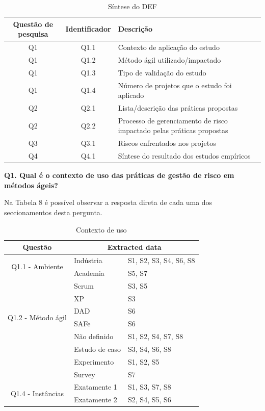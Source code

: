 \documentclass[
	12pt,
	openright,
	twoside,
	a4paper,
	english,
	brazil
	]{abntex2}
\begin{document}
\begin{table}[h!]
  \centering
  \caption{Síntese do DEF}
  \begin{tabular}{|c|c|l|}
  \hline
  \textbf{Questão de pesquisa} & \textbf{Identificador} & \textbf{Descrição} \\ \hline
  Q1 & Q1.1 & Contexto de aplicação do estudo \\ \hline
  Q1 & Q1.2 & Método ágil utilizado/impactado \\ \hline
  Q1 & Q1.3 & Tipo de validação do estudo \\ \hline
  Q1 & Q1.4 & Número de projetos que o estudo foi aplicado \\ \hline
  Q2 & Q2.1 & Lista/descrição das práticas propostas \\ \hline
  Q2 & Q2.2 & Processo de gerenciamento de risco impactado pelas práticas propostas \\ \hline
  Q3 & Q3.1 & Riscos enfrentados nos projetos \\ \hline
  Q4 & Q4.1 & Síntese do resultado dos estudos empíricos \\ \hline
  \end{tabular}
\end{table}

\textbf{Q1. Qual é o contexto de uso das práticas de gestão de risco em métodos ágeis?}

Na Tabela 8 é possível observar a resposta direta de cada uma dos seccionamentos desta pergunta.

\begin{table}[h!]
  \centering
  \caption{Contexto de uso}
  \begin{tabular}{|c|l|l|}
  \hline
  \textbf{Questão} & \multicolumn{2}{c|}{\textbf{Extracted data}} \\ \hline
  \multirow{2}{*}{Q1.1 - Ambiente} & Indústria & S1, S2, S3, S4, S6, S8 \\ \cline{2-3}
                                  & Academia  & S5, S7 \\ \hline
  \multirow{6}{*}{Q1.2 - Método ágil} & Scrum   & S3, S5 \\ \cline{2-3}
                                     & XP      & S3 \\ \cline{2-3}
                                     & DAD     & S6 \\ \cline{2-3}
                                     & SAFe    & S6 \\ \cline{2-3}
                                     & Não definido & S1, S2, S4, S7, S8 \\ \hline
  \multirow{3}{*}{Q1.3 - Tipo}        & Estudo de caso & S3, S4, S6, S8 \\ \cline{2-3}
                                     & Experimento    & S1, S2, S5 \\ \cline{2-3}
                                     & Survey         & S7 \\ \hline
  \multirow{2}{*}{Q1.4 - Instâncias}  & Exatamente 1   & S1, S3, S7, S8 \\ \cline{2-3}
                                     & Exatamente 2   & S2, S4, S5, S6 \\ \hline
  \end{tabular}
  \end{table}
\end{document}
